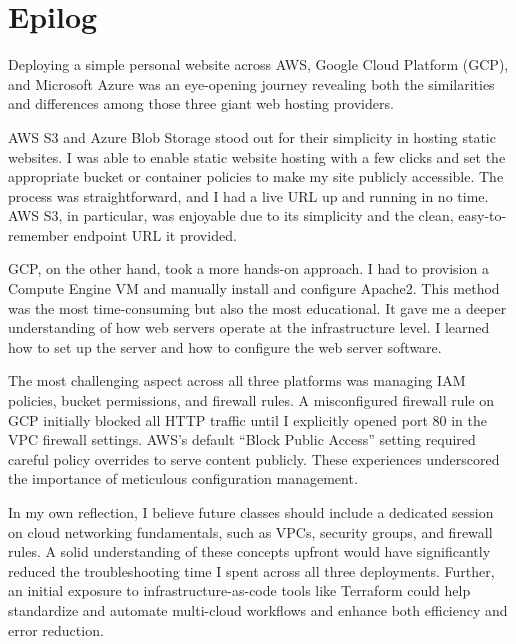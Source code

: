 \documentclass[12pt,letterpaper]{article}
\begin{document}
\section{Epilog}

Deploying a simple personal website across AWS, Google Cloud Platform (GCP), and
Microsoft Azure was an eye-opening journey revealing both the similarities and
differences among those three giant web hosting providers.

AWS S3 and Azure Blob Storage stood out for their simplicity in hosting static
websites. I was able to enable static website hosting with a few clicks and set
the appropriate bucket or container policies to make my site publicly accessible.
The process was straightforward, and I had a live URL up and running in no time.
AWS S3, in particular, was enjoyable due to its simplicity and the clean,
easy-to-remember endpoint URL it provided.

GCP, on the other hand, took a more hands-on approach. I had to provision a
Compute Engine VM and manually install and configure Apache2. This method was
the most time-consuming but also the most educational. It gave me a deeper
understanding of how web servers operate at the infrastructure level. I learned
how to set up the server and how to configure the web server software.

The most challenging aspect across all three platforms was managing IAM policies,
bucket permissions, and firewall rules. A misconfigured firewall rule on GCP
initially blocked all HTTP traffic until I explicitly opened port 80 in the VPC
firewall settings. AWS's default ``Block Public Access'' setting required careful
policy overrides to serve content publicly. These experiences underscored the
importance of meticulous configuration management.

In my own reflection, I believe future classes should include a dedicated session
on cloud networking fundamentals, such as VPCs, security groups, and firewall
rules. A solid understanding of these concepts upfront would have significantly
reduced the troubleshooting time I spent across all three deployments. Further,
an initial exposure to infrastructure-as-code tools like Terraform could help
standardize and automate multi-cloud workflows and enhance both efficiency and
error reduction.

\end{document}
